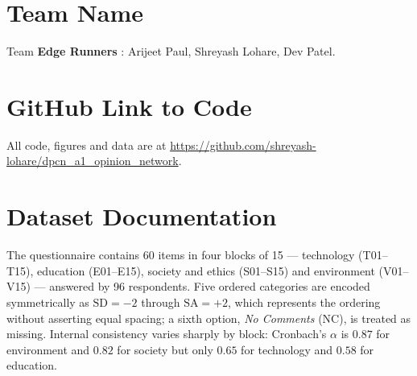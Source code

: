 \documentclass{article}
\begin{document}

\printAffiliationsAndNotice{}

\section{Team Name}
\label{sec:team}

Team \textbf{Edge Runners} : Arijeet Paul, Shreyash Lohare, Dev Patel.

\section{GitHub Link to Code}
\label{sec:github}

All code, figures and data are at
\url{https://github.com/shreyash-lohare/dpcn_a1_opinion_network}.

\section{Dataset Documentation}
\label{sec:data}

The questionnaire contains 60 items in four blocks of 15 --- technology
(T01--T15), education (E01--E15), society and ethics (S01--S15) and environment
(V01--V15) --- answered by 96 respondents. Five ordered categories are encoded
symmetrically as $\text{SD}=-2$ through $\text{SA}=+2$, which represents the
ordering without asserting equal spacing; a sixth option, \emph{No Comments}
(NC), is treated as missing. Internal consistency varies sharply by block:
Cronbach's $\alpha$ is $0.87$ for environment and $0.82$ for society but only
$0.65$ for technology and $0.58$ for education.
\end{document}
